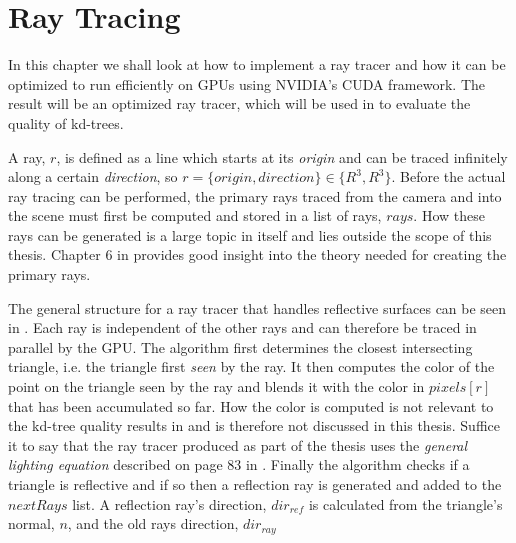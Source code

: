 


\chapter{Ray Tracing}\label{chp:rayTracing}





In this chapter we shall look at how to implement a ray tracer and how it can be
optimized to run efficiently on GPUs using NVIDIA's CUDA framework. The result
will be an optimized ray tracer, which will be used in 
to evaluate the quality of kd-trees.

A ray, $r$, is defined as a line which starts at its \textit{origin} and can be
traced infinitely along a certain \textit{direction}, so $r = \{origin,
direction\} \in \{R^3, R^3\}$. Before the actual ray tracing can be performed,
the primary rays traced from the camera and into the scene must first be
computed and stored in a list of rays, $rays$. How these rays can be generated
is a large topic in itself and lies outside the scope of this thesis. Chapter 6
in  provides good insight into the theory needed for creating
the primary rays.

The general structure for a ray tracer that handles reflective surfaces can be
seen in . Each ray is independent of the other rays
and can therefore be traced in parallel by the GPU. The algorithm first
determines the closest intersecting triangle, i.e. the triangle first
\textit{seen} by the ray. It then computes the color of the point on the
triangle seen by the ray and blends it with the color in $pixels[r]$ that has
been accumulated so far. How the color is computed is not relevant to the
kd-tree quality results in  and is therefore not
discussed in this thesis. Suffice it to say that the ray tracer produced as part
of the thesis uses the \textit{general lighting equation} described on page 83
in . Finally the algorithm checks if a triangle is reflective and
if so then a reflection ray is generated and added to the $nextRays$ list. A
reflection ray's direction, $dir_{ref}$ is calculated from the triangle's
normal, $n$, and the old rays direction, $dir_{ray}$

